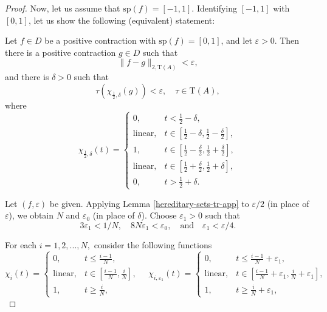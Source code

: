 \documentclass[12pt, oneside, psamsfonts]{amsart}
\theoremstyle{definition}
\theoremstyle{remark}
\numberwithin{equation}{section}
\newcommand{\norm}[1]{\| #1\|}
\newcommand{\eps}{\varepsilon}
\newcommand{\tr}{\mathrm{T}}
\begin{document}
\begin{proof}
Now, let us assume that $\mathrm{sp}(f) = [-1, 1]$. Identifying $[-1, 1]$ with $[0, 1]$, let us show the following (equivalent) statement: 

Let $f \in D$ be a positive contraction with $\mathrm{sp}(f) = [0, 1]$, and let $\eps>0$. Then there is a positive contraction $g \in D$ such that
\begin{equation}\label{positive-s1}
\norm{f - g }_{2, \tr(A)} < \eps,
\end{equation} 
and there is $\delta>0$ such that
\begin{equation}\label{positive-s2}
\tau(\chi_{\frac{1}{2}, \delta}(g)) < \eps,\quad \tau \in \tr(A),
\end{equation}
where 
$$ \chi_{\frac{1}{2}, \delta}(t) = \left\{
\begin{array}{ll}
0, & t < \frac{1}{2} - \delta, \\
\mathrm{linear}, & t \in [\frac{1}{2} - \delta, \frac{1}{2} - \frac{\delta}{2}],\\
1, & t \in [\frac{1}{2} - \frac{\delta}{2}, \frac{1}{2} + \frac{\delta}{2}],\\
\mathrm{linear}, & t \in [\frac{1}{2} + \frac{\delta}{2}, \frac{1}{2} + {\delta}],\\
0, & t > \frac{1}{2} + \delta.
\end{array}
\right. $$


Let $(f, \eps)$ be given. Applying Lemma \ref{hereditary-sets-tr-app} to $\eps/2$ (in place of $\eps$), we obtain $N$ and  $\eps_0$ (in place of $\delta$). Choose $\eps_1>0$ such that $$3\eps_1< 1/N,\quad 8N\eps_1 < \eps_0, \quad \mathrm{and} \quad  \eps_1 < \eps/4.$$



For each $i=1, 2, ..., N,$ consider the following functions
$$\chi_i(t) = \left\{ 
\begin{array}{ll}
0, & t \leq \frac{i-1}{N}, \\
\mathrm{linear}, & t \in [\frac{i-1}{N}, \frac{i}{N}], \\
1, & t \geq \frac{i}{N},
\end{array} 
\right.
\quad
\chi_{i, \eps_1}(t) = \left\{ 
\begin{array}{ll}
0, & t \leq \frac{i-1}{N} + \eps_1, \\
\mathrm{linear}, & t \in [\frac{i-1}{N} + \eps_1, \frac{i}{N}+\eps_1], \\
1, & t \geq \frac{i}{N}+\eps_1,
\end{array} 
\right.
$$


\end{proof}
\end{document}
